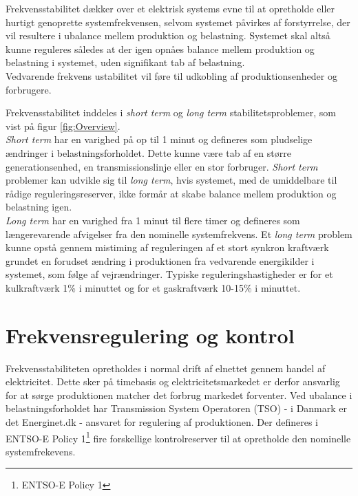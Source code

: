 
\label{Frekvensstabilitet}

Frekvensstabilitet dækker over et elektrisk systems evne til at opretholde eller hurtigt genoprette systemfrekvensen, selvom systemet påvirkes af forstyrrelse, der vil resultere i ubalance mellem produktion og belastning. Systemet skal altså kunne reguleres således at der igen opnåes balance mellem produktion og belastning i systemet, uden signifikant tab af belastning.\\
Vedvarende frekvens ustabilitet vil føre til udkobling af produktionsenheder og forbrugere.

Frekvensstabilitet inddeles i \textit{short term} og \textit{long term} stabilitetsproblemer, som vist på figur \ref{fig:Overview}.\\
\textit{Short term} har en varighed på op til 1 minut og defineres som pludselige ændringer i belastningsforholdet. Dette kunne være tab af en større generationsenhed, en transmissionslinje eller en stor forbruger. \textit{Short term} problemer kan udvikle sig til \textit{long term}, hvis systemet, med de umiddelbare til rådige reguleringsreserver, ikke formår at skabe balance mellem produktion og belastning igen.\\
\textit{Long term} har en varighed fra 1 minut til flere timer og defineres som længerevarende afvigelser fra den nominelle systemfrekvens. Et \textit{long term} problem kunne opstå gennem mistiming af reguleringen af et stort synkron kraftværk grundet en forudset ændring i produktionen fra vedvarende energikilder i systemet, som følge af vejrændringer.
Typiske reguleringshastigheder er for et kulkraftværk 1\% i minuttet og for et gaskraftværk 10-15\% i minuttet.

\section{Frekvensregulering og kontrol}
Frekvensstabiliteten opretholdes i normal drift af elnettet gennem handel af elektricitet. Dette sker på timebasis og elektricitetsmarkedet er derfor ansvarlig for at sørge produktionen matcher det forbrug markedet forventer. Ved ubalance i belastningsforholdet har Transmission System Operatoren (TSO) - i Danmark er det Energinet.dk - ansvaret for regulering af produktionen. Der defineres i ENTSO-E Policy 1\footnote{ENTSO-E Policy 1} fire forskellige kontrolreserver til at opretholde den nominelle systemfrekevens.

